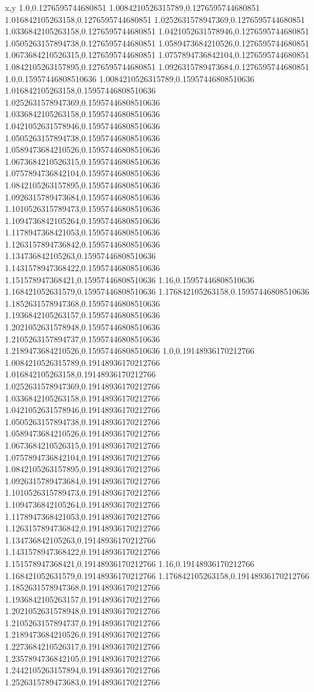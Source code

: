 x,y
1.0,0.1276595744680851
1.0084210526315789,0.1276595744680851
1.016842105263158,0.1276595744680851
1.0252631578947369,0.1276595744680851
1.0336842105263158,0.1276595744680851
1.0421052631578946,0.1276595744680851
1.0505263157894738,0.1276595744680851
1.0589473684210526,0.1276595744680851
1.0673684210526315,0.1276595744680851
1.0757894736842104,0.1276595744680851
1.0842105263157895,0.1276595744680851
1.0926315789473684,0.1276595744680851
1.0,0.15957446808510636
1.0084210526315789,0.15957446808510636
1.016842105263158,0.15957446808510636
1.0252631578947369,0.15957446808510636
1.0336842105263158,0.15957446808510636
1.0421052631578946,0.15957446808510636
1.0505263157894738,0.15957446808510636
1.0589473684210526,0.15957446808510636
1.0673684210526315,0.15957446808510636
1.0757894736842104,0.15957446808510636
1.0842105263157895,0.15957446808510636
1.0926315789473684,0.15957446808510636
1.1010526315789473,0.15957446808510636
1.1094736842105264,0.15957446808510636
1.1178947368421053,0.15957446808510636
1.1263157894736842,0.15957446808510636
1.134736842105263,0.15957446808510636
1.1431578947368422,0.15957446808510636
1.151578947368421,0.15957446808510636
1.16,0.15957446808510636
1.168421052631579,0.15957446808510636
1.176842105263158,0.15957446808510636
1.1852631578947368,0.15957446808510636
1.1936842105263157,0.15957446808510636
1.2021052631578948,0.15957446808510636
1.2105263157894737,0.15957446808510636
1.2189473684210526,0.15957446808510636
1.0,0.19148936170212766
1.0084210526315789,0.19148936170212766
1.016842105263158,0.19148936170212766
1.0252631578947369,0.19148936170212766
1.0336842105263158,0.19148936170212766
1.0421052631578946,0.19148936170212766
1.0505263157894738,0.19148936170212766
1.0589473684210526,0.19148936170212766
1.0673684210526315,0.19148936170212766
1.0757894736842104,0.19148936170212766
1.0842105263157895,0.19148936170212766
1.0926315789473684,0.19148936170212766
1.1010526315789473,0.19148936170212766
1.1094736842105264,0.19148936170212766
1.1178947368421053,0.19148936170212766
1.1263157894736842,0.19148936170212766
1.134736842105263,0.19148936170212766
1.1431578947368422,0.19148936170212766
1.151578947368421,0.19148936170212766
1.16,0.19148936170212766
1.168421052631579,0.19148936170212766
1.176842105263158,0.19148936170212766
1.1852631578947368,0.19148936170212766
1.1936842105263157,0.19148936170212766
1.2021052631578948,0.19148936170212766
1.2105263157894737,0.19148936170212766
1.2189473684210526,0.19148936170212766
1.2273684210526317,0.19148936170212766
1.2357894736842105,0.19148936170212766
1.2442105263157894,0.19148936170212766
1.2526315789473683,0.19148936170212766
